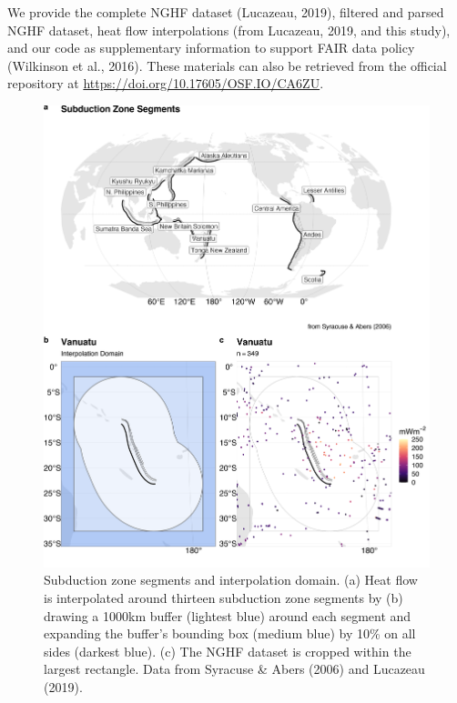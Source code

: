 \documentclass[draft,linenumbers]{agujournal2018}
\begin{document}
We provide the complete NGHF dataset (Lucazeau, 2019), filtered and
parsed NGHF dataset, heat flow interpolations (from Lucazeau, 2019, and
this study), and our code as supplementary information to support FAIR
data policy (Wilkinson et al., 2016). These materials can also be
retrieved from the official repository at
\url{https://doi.org/10.17605/OSF.IO/CA6ZU}.

\begin{figure}[h]

{\centering \includegraphics[width=0.95\linewidth,]{../figs/base/segs_comp} 

}

\caption{Subduction zone segments and interpolation domain. (a) Heat flow is interpolated around thirteen subduction zone segments by (b) drawing a 1000km buffer (lightest blue) around each segment and expanding the buffer's bounding box (medium blue) by 10\% on all sides (darkest blue). (c) The NGHF dataset is cropped within the largest rectangle. Data from Syracuse \& Abers (2006) and Lucazeau (2019).}\label{fig:segments}
\end{figure}

\clearpage
\end{document}
